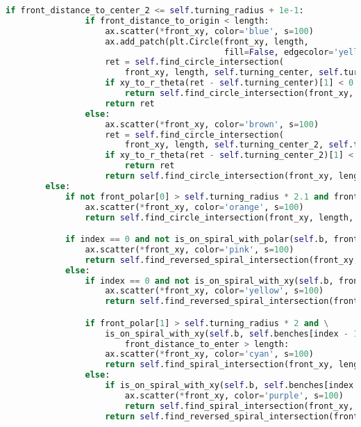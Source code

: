 \begin{lstlisting}[language=python]
            if front_distance_to_center_2 <= self.turning_radius + 1e-1:
                if front_distance_to_origin < length:
                    ax.scatter(*front_xy, color='blue', s=100)
                    ax.add_patch(plt.Circle(front_xy, length,
                                            fill=False, edgecolor='yellow'))
                    ret = self.find_circle_intersection(
                        front_xy, length, self.turning_center, self.turning_radius, reverse=True)
                    if xy_to_r_theta(ret - self.turning_center)[1] < 0:
                        return self.find_circle_intersection(front_xy, length, self.turning_center, self.turning_radius)
                    return ret
                else:
                    ax.scatter(*front_xy, color='brown', s=100)
                    ret = self.find_circle_intersection(
                        front_xy, length, self.turning_center_2, self.turning_radius, reverse=True)
                    if xy_to_r_theta(ret - self.turning_center_2)[1] < xy_to_r_theta(front_xy - self.turning_center_2)[1]:
                        return ret
                    return self.find_circle_intersection(front_xy, length, self.turning_center_2, self.turning_radius)
        else:
            if not front_polar[0] > self.turning_radius * 2.1 and front_distance_to_exit < length and not is_on_spiral_with_xy(self.b, front_xy):
                ax.scatter(*front_xy, color='orange', s=100)
                return self.find_circle_intersection(front_xy, length, self.turning_center_2, self.turning_radius, reverse=True)

            if index == 0 and not is_on_spiral_with_polar(self.b, front_polar):
                ax.scatter(*front_xy, color='pink', s=100)
                return self.find_reversed_spiral_intersection(front_xy, length)
            else:
                if index == 0 and not is_on_spiral_with_xy(self.b, front_xy):
                    ax.scatter(*front_xy, color='yellow', s=100)
                    return self.find_reversed_spiral_intersection(front_xy, length)

                if front_polar[1] > self.turning_radius * 2 and \
                    is_on_spiral_with_xy(self.b, self.benches[index - 1].front_xy) and \
                        front_distance_to_enter > length:
                    ax.scatter(*front_xy, color='cyan', s=100)
                    return self.find_spiral_intersection(front_xy, length)
                else:
                    if is_on_spiral_with_xy(self.b, self.benches[index - 1].front_xy):
                        ax.scatter(*front_xy, color='purple', s=100)
                        return self.find_spiral_intersection(front_xy, length)
                    return self.find_reversed_spiral_intersection(front_xy, length)


\end{lstlisting}
